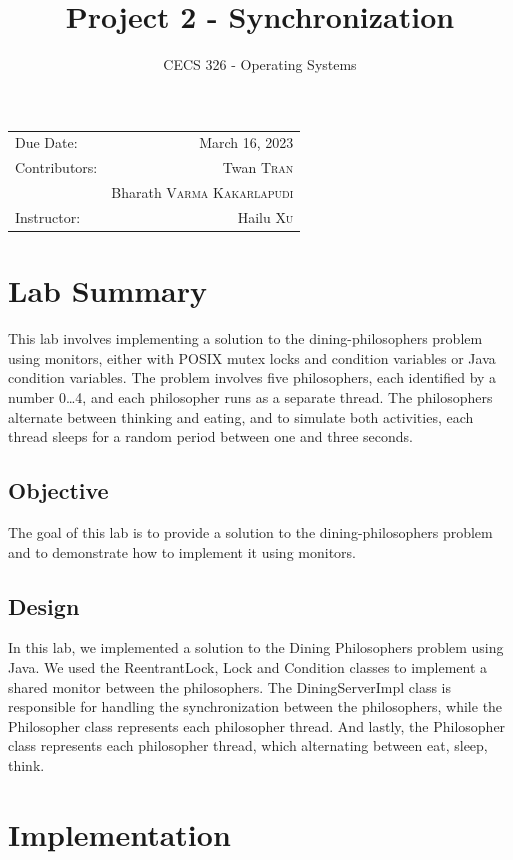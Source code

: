 \documentclass{article}
\title{Project 2 - Synchronization}
\date{CECS 326 - Operating Systems}
\begin{document}
\maketitle

\begin{center}
	\begin{tabular}{l r}
		Due Date: & March 16, 2023 \\ %
		Contributors: & Twan \textsc{Tran} \\ %
		&  Bharath \textsc{Varma Kakarlapudi} \\
		Instructor: & Hailu \textsc{Xu} %
	\end{tabular}
\end{center}

\section{Lab Summary}

This lab involves implementing a solution to the dining-philosophers problem using monitors, either with POSIX mutex locks and condition variables or Java condition variables. The problem involves five philosophers, each identified by a number 0\dots 4, and each philosopher runs as a separate thread. The philosophers alternate between thinking and eating, and to simulate both activities, each thread sleeps for a random period between one and three seconds.

\subsection{Objective}
The goal of this lab is to provide a solution to the dining-philosophers problem and to demonstrate how to implement it using monitors.

\subsection{Design}
In this lab, we implemented a solution to the Dining Philosophers problem using Java. We used the ReentrantLock, Lock and Condition classes to implement a shared monitor between the philosophers. The DiningServerImpl class is responsible for handling the synchronization between the philosophers, while the Philosopher class represents each philosopher thread. And lastly, the Philosopher class represents each philosopher thread, which alternating between eat, sleep, think.

\section{Implementation}
\end{document}
